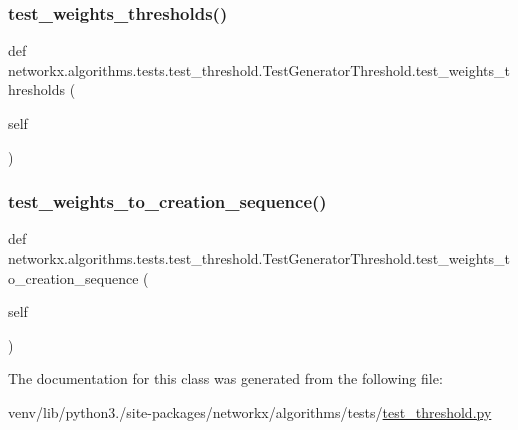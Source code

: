 \subsubsection{\texorpdfstring{test\+\_\+weights\+\_\+thresholds()}{test\_weights\_thresholds()}}
{\footnotesize\ttfamily def networkx.\+algorithms.\+tests.\+test\+\_\+threshold.\+Test\+Generator\+Threshold.\+test\+\_\+weights\+\_\+thresholds (\begin{DoxyParamCaption}\item[{}]{self }\end{DoxyParamCaption})}

\mbox{\label{classnetworkx_1_1algorithms_1_1tests_1_1test__threshold_1_1TestGeneratorThreshold_a432e1e107e2c9434da2e9f82c92c0d59}} 
\subsubsection{\texorpdfstring{test\+\_\+weights\+\_\+to\+\_\+creation\+\_\+sequence()}{test\_weights\_to\_creation\_sequence()}}
{\footnotesize\ttfamily def networkx.\+algorithms.\+tests.\+test\+\_\+threshold.\+Test\+Generator\+Threshold.\+test\+\_\+weights\+\_\+to\+\_\+creation\+\_\+sequence (\begin{DoxyParamCaption}\item[{}]{self }\end{DoxyParamCaption})}



The documentation for this class was generated from the following file\+:\begin{DoxyCompactItemize}
\item 
venv/lib/python3./site-\/packages/networkx/algorithms/tests/\hyperlink{test__threshold_8py}{test\+\_\+threshold.\+py}\end{DoxyCompactItemize}
